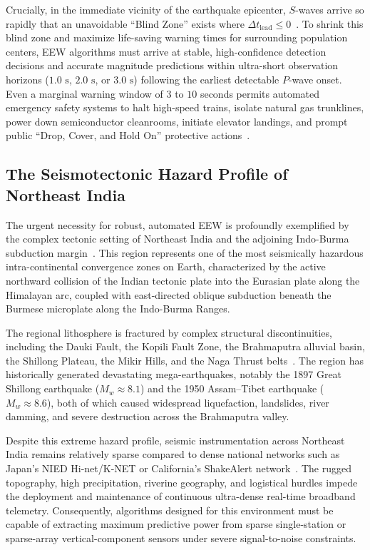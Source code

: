 \documentclass[journal]{IEEEtran}
\begin{document}
Crucially, in the immediate vicinity of the earthquake epicenter, $S$-waves arrive so rapidly that an unavoidable ``Blind Zone'' exists where $\Delta t_{\text{lead}} \le 0$~\cite{allen2019earthquake, usgs2026eew}. To shrink this blind zone and maximize life-saving warning times for surrounding population centers, EEW algorithms must arrive at stable, high-confidence detection decisions and accurate magnitude predictions within ultra-short observation horizons ($1.0\text{ s}$, $2.0\text{ s}$, or $3.0\text{ s}$) following the earliest detectable $P$-wave onset. Even a marginal warning window of $3$ to $10$ seconds permits automated emergency safety systems to halt high-speed trains, isolate natural gas trunklines, power down semiconductor cleanrooms, initiate elevator landings, and prompt public ``Drop, Cover, and Hold On'' protective actions~\cite{usgs2026eew}.

\subsection{The Seismotectonic Hazard Profile of Northeast India}
The urgent necessity for robust, automated EEW is profoundly exemplified by the complex tectonic setting of Northeast India and the adjoining Indo-Burma subduction margin~\cite{nidm_northeast, mittal2025india}. This region represents one of the most seismically hazardous intra-continental convergence zones on Earth, characterized by the active northward collision of the Indian tectonic plate into the Eurasian plate along the Himalayan arc, coupled with east-directed oblique subduction beneath the Burmese microplate along the Indo-Burma Ranges.

The regional lithosphere is fractured by complex structural discontinuities, including the Dauki Fault, the Kopili Fault Zone, the Brahmaputra alluvial basin, the Shillong Plateau, the Mikir Hills, and the Naga Thrust belts~\cite{nidm_northeast}. The region has historically generated devastating mega-earthquakes, notably the 1897 Great Shillong earthquake ($M_w \approx 8.1$) and the 1950 Assam--Tibet earthquake ($M_w \approx 8.6$), both of which caused widespread liquefaction, landslides, river damming, and severe destruction across the Brahmaputra valley. 

Despite this extreme hazard profile, seismic instrumentation across Northeast India remains relatively sparse compared to dense national networks such as Japan's NIED Hi-net/K-NET or California's ShakeAlert network~\cite{mittal2025india, esposito2025aiot}. The rugged topography, high precipitation, riverine geography, and logistical hurdles impede the deployment and maintenance of continuous ultra-dense real-time broadband telemetry. Consequently, algorithms designed for this environment must be capable of extracting maximum predictive power from sparse single-station or sparse-array vertical-component sensors under severe signal-to-noise constraints.
\end{document}
